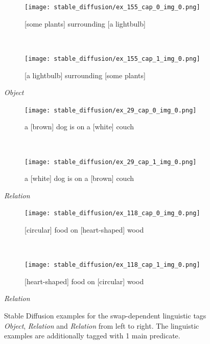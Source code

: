 \begin{figure}[ht]
\centering
    \begin{minipage}[t]{.30\textwidth}
        \begin{subfigure}[t]{\textwidth}
        \centering
        \texttt{[image: stable\_diffusion/ex\_155\_cap\_0\_img\_0.png]}
        \caption{[some plants] surrounding [a lightbulb]}
        \end{subfigure}\\
        \begin{subfigure}[t]{\textwidth}
        \centering
        \texttt{[image: stable\_diffusion/ex\_155\_cap\_1\_img\_0.png]}
        \caption{[a lightbulb] surrounding [some plants]}
        \end{subfigure}%
        \caption*{\textit{Object}}
    \end{minipage}
    \hfill
    \begin{minipage}[t]{.30\textwidth}
        \begin{subfigure}[t]{\textwidth}
        \centering
        \texttt{[image: stable\_diffusion/ex\_29\_cap\_0\_img\_0.png]}
        \caption{a [brown] dog is on a [white] couch}
        \end{subfigure}\\
        \vspace{9pt}
        \begin{subfigure}[t]{\textwidth}
        \centering
        \texttt{[image: stable\_diffusion/ex\_29\_cap\_1\_img\_0.png]}
        \caption{a [white] dog is on a [brown] couch}
        \end{subfigure}%
        \caption*{\textit{Relation}}
    \end{minipage}
    \hfill
    \begin{minipage}[t]{.30\textwidth}
        \begin{subfigure}[t]{\textwidth}
        \centering
        \texttt{[image: stable\_diffusion/ex\_118\_cap\_0\_img\_0.png]}
        \caption{[circular] food on [heart-shaped] wood}
        \end{subfigure}\\
        \begin{subfigure}[t]{\textwidth}
        \centering
        \texttt{[image: stable\_diffusion/ex\_118\_cap\_1\_img\_0.png]}
        \caption{[heart-shaped] food on [circular] wood}
        \end{subfigure}%
        \caption*{\textit{Relation}}
    \end{minipage}%
    \caption{Stable Diffusion examples for the swap-dependent linguistic tags \textit{Object}, \textit{Relation} and \textit{Relation} from left to right. The linguistic examples are additionally tagged with 1 main predicate.}
    \label{fig:stable-diffusion-examples}
\end{figure}

